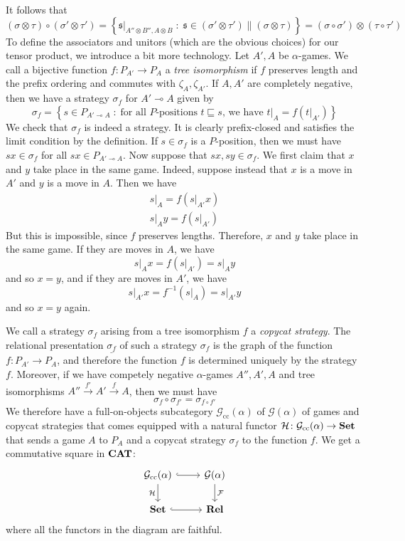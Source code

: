 \documentclass[11pt]{article} %
\theoremstyle{plain} %
\theoremstyle{definition} %
\theoremstyle{note}
\theoremstyle{exercisestyle}
\newcommand{\catname}[1]{{\normalfont\textbf{#1}}}
\newcommand{\CAT}{\catname{CAT}}
\newcommand{\Set}{\catname{Set}}
\newcommand{\Rel}{\catname{Rel}}
\newcommand*\from{\colon}
\newcommand{\cmap}[3]{#1\from{}#2\to{}#3}
\def \inv {^{-1}}
\newcommand{\tensor}{\otimes}
\renewcommand{\implies}{\multimap}
\newcommand{\comp}[2]{#1 \circ #2}
\newcommand{\G}{\mathcal G}
\newcommand{\suchthat}{\;\colon\;}
\newcommand{\F}{\mathcal F}
\newcommand{\s}{\mathfrak s}
\newcommand{\bracketed}[1]{\left({#1}\right)}
\newcommand{\prefix}{\sqsubseteq}
\newcommand{\grel}[1]{\underline{#1}}
\DeclareMathOperator{\cc}{cc}
\renewcommand{\H}{\mathcal H}
\begin{document}
It follows that
\[
  \comp{(\sigma\tensor\tau)}{(\sigma'\tensor\tau')}
  = \left\{\s\vert_{A''\tensor B'', A\tensor B}\suchthat\s\in(\sigma'\tensor\tau')\|(\sigma\tensor\tau)\right\}
  = (\comp\sigma{\sigma'})\tensor(\comp\tau{\tau'})
  \]
To define the associators and unitors (which are the obvious choices) for our tensor product, we introduce a bit more technology.  Let $A',A$ be $\alpha$-games.  We call a bijective function $\cmap{f}{P_{A'}}{P_A}$ a \emph{tree isomorphism} if $f$ preserves length and the prefix ordering and commutes with $\zeta_A,\zeta_{A'}$.  If $A,A'$ are completely negative, then we have a strategy $\sigma_f$ for $A'\implies A$ given by
\[
  \sigma_f = \left\{s\in P_{A'\implies A}\suchthat \textrm{for all $P$-positions $t\prefix s$, we have $t\vert_A = f\left(t\vert_{A'}\right)$}\right\}
  \]
We check that $\sigma_f$ is indeed a strategy.  It is clearly prefix-closed and satisfies the limit condition by the definition.  If $s\in\sigma_f$ is a $P$-position, then we must have $sx\in\sigma_f$ for all $sx\in P_{A'\implies A}$.  Now suppose that $sx,sy\in \sigma_f$.  We first claim that $x$ and $y$ take place in the same game.  Indeed, suppose instead that $x$ is a move in $A'$ and $y$ is a move in $A$.  Then we have
\begin{gather*}
  s\vert_A = f\bracketed{s\vert_{A'}x} \\
  s\vert_Ay = f\bracketed{s\vert_{A'}}
\end{gather*}
But this is impossible, since $f$ preserves lengths.  Therefore, $x$ and $y$ take place in the same game.  If they are moves in $A$, we have
\[
  s\vert_Ax = f\bracketed{s\vert_{A'}} = s\vert_Ay
  \]
and so $x=y$, and if they are moves in $A'$, we have
\[
  s\vert_{A'}x = f\inv\bracketed{s\vert_A} = s\vert_{A'}y
  \]
and so $x=y$ again.

We call a strategy $\sigma_f$ arising from a tree isomorphism $f$ a \emph{copycat strategy}.  The relational presentation $\grel{\sigma_f}$ of such a strategy $\sigma_f$ is the graph of the function $\cmap{f}{P_{A'}}{P_A}$, and therefore the function $f$ is determined uniquely by the strategy $f$.  Moreover, if we have competely negative $\alpha$-games $A'', A', A$ and tree isomorphisms $A''\xrightarrow{f'}A'\xrightarrow{f}A$, then we must have
\[
  \comp{\sigma_f}{\sigma_{f'}} = \sigma_{\comp{f}{f'}}
  \]
We therefore have a full-on-objects subcategory $\G_{\cc}(\alpha)$ of $\G(\alpha)$ of games and copycat strategies that comes equipped with a natural functor $\cmap{\H}{\G_{\cc}(\alpha)}{\Set}$ that sends a game $A$ to $P_A$ and a copycat strategy $\sigma_f$ to the function $f$.  We get a commutative square in $\CAT$:
\[
  \begin{tikzcd}
    \G_{\cc}(\alpha) \arrow[r, hook] \arrow[d, "\H"']
      & \G(\alpha) \arrow[d, "\F"] \\
    \Set \arrow[r, hook]
      & \Rel
  \end{tikzcd}
  \]
where all the functors in the diagram are faithful.  
\end{document}
